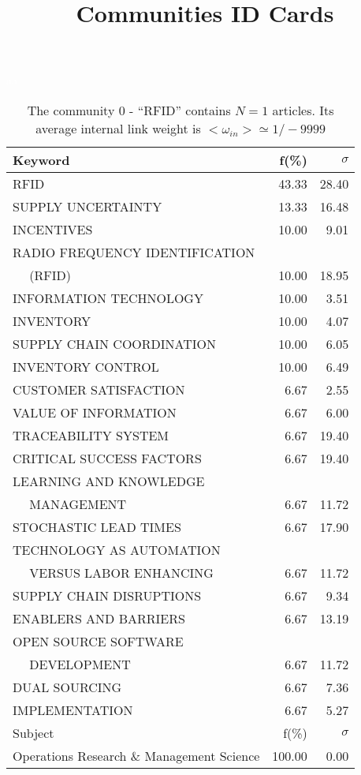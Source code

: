 \documentclass[a4paper,11pt]{report}
\title{{\bf Communities ID Cards}}
\date{\begin{flushleft}This document gather the ``ID Cards'' of the CC communities found within your database.\\
 The CC network was built by keeping a link between articles sharing at least 10 references. The communities characterized here correspond to the ones found in the level 0 (in the sense of the Louvain algo) which gathers more than 0 articles.\\
 These ID cards displays the most frequent keywords, subject categories, journals of publication, institution, countries, authors, references and reference journals of the articles of each community. The significance of an item $\sigma = \sqrt{N} (f - p) / \sqrt{p(1-p)}$ [where $N$ is the number of articles within the community and $f$ and $p$ are the proportion of articles respectively within the community and within the database displaying that item ] is also given (for example $\sigma > 5$ is really highly significant).\\
\vspace{1cm}
\copyright Sebastian Grauwin, Liu Weizhi - (2014) \end{flushleft}}
\begin{document}
\begin{landscape}
\maketitle
\clearpage

\begin{table}[!ht]
\caption{The community 0 - ``RFID'' contains $N = 1$ articles. Its average internal link weight is $<\omega_{in}> \simeq 1/-9999$ }
\textcolor{white}{aa}\\
{\scriptsize\begin{tabular}{|l r r|}
\hline
Keyword & f(\%) & $\sigma$\\
\hline
RFID & 43.33 & 28.40\\
SUPPLY UNCERTAINTY & 13.33 & 16.48\\
INCENTIVES & 10.00 & 9.01\\
RADIO FREQUENCY IDENTIFICATION &  & \\
$\quad$ (RFID) & 10.00 & 18.95\\
INFORMATION TECHNOLOGY & 10.00 & 3.51\\
INVENTORY & 10.00 & 4.07\\
SUPPLY CHAIN COORDINATION & 10.00 & 6.05\\
INVENTORY CONTROL & 10.00 & 6.49\\
CUSTOMER SATISFACTION & 6.67 & 2.55\\
VALUE OF INFORMATION & 6.67 & 6.00\\
TRACEABILITY SYSTEM & 6.67 & 19.40\\
CRITICAL SUCCESS FACTORS & 6.67 & 19.40\\
LEARNING AND KNOWLEDGE &  & \\
$\quad$ MANAGEMENT & 6.67 & 11.72\\
STOCHASTIC LEAD TIMES & 6.67 & 17.90\\
TECHNOLOGY AS AUTOMATION &  & \\
$\quad$ VERSUS LABOR ENHANCING & 6.67 & 11.72\\
SUPPLY CHAIN DISRUPTIONS & 6.67 & 9.34\\
ENABLERS AND BARRIERS & 6.67 & 13.19\\
OPEN SOURCE SOFTWARE &  & \\
$\quad$ DEVELOPMENT & 6.67 & 11.72\\
DUAL SOURCING & 6.67 & 7.36\\
IMPLEMENTATION & 6.67 & 5.27\\
\hline
\hline
Subject & f(\%) & $\sigma$\\
\hline
Operations Research \& Management Science & 100.00 & 0.00\\

\end{tabular}}
\end{table}
\end{landscape}
\end{document}
